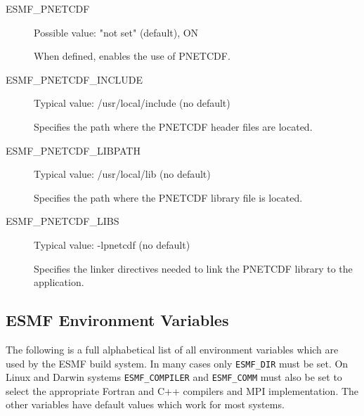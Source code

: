 \begin{description}

\item[ESMF\_PNETCDF] Possible value: "not set" (default), ON

When defined, enables the use of PNETCDF.

\item[ESMF\_PNETCDF\_INCLUDE] Typical value: /usr/local/include (no default)

Specifies the path where the PNETCDF header files are located.

\item[ESMF\_PNETCDF\_LIBPATH] Typical value: /usr/local/lib (no default)

Specifies the path where the PNETCDF library file is located.

\item[ESMF\_PNETCDF\_LIBS] Typical value: -lpnetcdf (no default)

Specifies the linker directives needed to link the PNETCDF library to the
application.
\end{description}

\subsection{ESMF Environment Variables}
\label{EnvironmentVariables}

The following is a full alphabetical list of all environment variables which
are used by the ESMF build system. In many cases only {\tt ESMF\_DIR} must be 
set. On Linux and Darwin systems {\tt ESMF\_COMPILER} and {\tt ESMF\_COMM} must
also be set to select the appropriate Fortran and C++ compilers and MPI 
implementation. The other variables have default values which work for
most systems.

